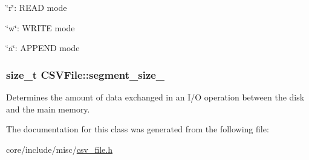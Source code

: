 \char`\"{}r\char`\"{}\+: R\+E\+A\+D mode

\char`\"{}w\char`\"{}\+: W\+R\+I\+T\+E mode

\char`\"{}a\char`\"{}\+: A\+P\+P\+E\+N\+D mode \hypertarget{classCSVFile_a4f4728017d51972485e6e03d5a2cff46}{}
\subsubsection[{segment\+\_\+size\+\_\+}]{\setlength{\rightskip}{0pt plus 5cm}size\+\_\+t C\+S\+V\+File\+::segment\+\_\+size\+\_\+\hspace{0.3cm}{\ttfamily [private]}}\label{classCSVFile_a4f4728017d51972485e6e03d5a2cff46}
Determines the amount of data exchanged in an I/\+O operation between the disk and the main memory. 

The documentation for this class was generated from the following file\+:\begin{DoxyCompactItemize}
\item 
core/include/misc/\hyperlink{csv__file_8h}{csv\+\_\+file.\+h}\end{DoxyCompactItemize}

